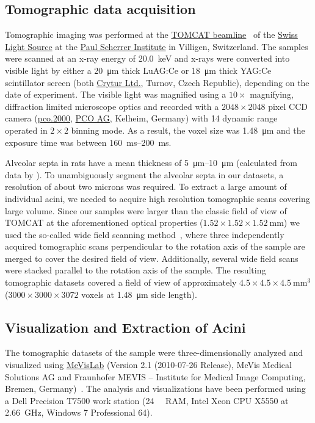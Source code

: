\documentclass[final,paper=a4,DIV=calc,abstract,english]{scrartcl}
\begin{document}
\subsection{Tomographic data acquisition}
Tomographic imaging was performed at the \href{http://www.psi.ch/sls/tomcat/}{TOMCAT beamline}~\citep{Stampanoni2006a} of the \href{http://www.psi.ch/sls/}{Swiss Light Source} at the \href{http://www.psi.ch/}{Paul Scherrer Institute} in Villigen, Switzerland.
The samples were scanned at an x-ray energy of \SI{20.0}{\kilo\electronvolt} and x-rays were converted into visible light by either a \SI{20}{\micro\meter} thick LuAG:Ce or \SI{18}{\micro\meter} thick YAG:Ce scintillator screen (both \href{http://www.crytur.cz/}{Crytur Ltd.}, Turnov, Czech Republic), depending on the date of experiment.
The visible light was magnified using a \(10\times\) magnifying, diffraction limited microscope optics and recorded with a \(2048\times2048\) pixel CCD camera (\href{http://www.pco.de/sensitive-cameras/pco2000/}{pco.2000}, \href{http://www.pco.de/}{PCO AG}, Kelheim, Germany) with \SI{14}{\bit} dynamic range operated in \(2\times2\) binning mode.
As a result, the voxel size was \SI{1.48}{\micro\meter} and the exposure time was between \SIrange{160}{200}{\milli\second}.

Alveolar septa in rats have a mean thickness of \SIrange{5}{10}{\micro\meter} (calculated from data by \citet{Burri1974}).
To unambiguously segment the alveolar septa in our datasets, a resolution of about two microns was required.
To extract a large amount of individual acini, we needed to acquire high resolution tomographic scans covering large volume.
Since our samples were larger than the classic field of view of TOMCAT at the aforementioned optical properties (\(1.52\times1.52\times\SI{1.52}{\milli\meter}\)) we used the so-called wide field scanning method~\citep{Haberthuer2010}, where three independently acquired tomographic scans perpendicular to the rotation axis of the sample are merged to cover the desired field of view.
Additionally, several wide field scans were stacked parallel to the rotation axis of the sample.
The resulting tomographic datasets covered a field of view of approximately \(4.5\times4.5\times\SI{4.5}{\milli\meter\cubed}\) (\(3000\times3000\times3072\) voxels at \SI{1.48}{\micro\meter} side length).

\subsection{Visualization and Extraction of Acini}
The tomographic datasets of the sample were three-dimensionally analyzed and visualized using \href{http://mevislab.de}{MeVisLab} (Version 2.1 (2010-07-26 Release), MeVis Medical Solutions AG and Fraunhofer MEVIS -- Institute for Medical Image Computing, Bremen, Germany)~\citep{Bitter2007}.
The analysis and visualizations have been performed using a Dell Precision T7500 work station (\SI{24}{\giga\byte} RAM, Intel Xeon CPU X5550 at \SI{2.66}{\giga\hertz}, Windows 7 Professional \SI{64}{\bit}).
\end{document}
